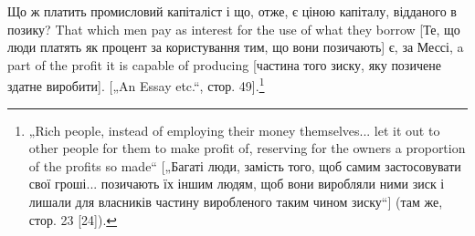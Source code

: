 Що ж платить промисловий капіталіст і що, отже, є ціною
капіталу, відданого в позику? That which men pay as interest for
the use of what they borrow [Те, що люди платять як процент за
користування тим, що вони позичають] є, за Мессі, a part of the
profit it is capable of producing [частина того зиску, яку позичене
здатне виробити]. [„An Essay etc.“, стор. 49].\footnote{
„Rich people, instead of employing their money themselves... let it out to
other people for them to make profit of, reserving for the owners a proportion of
the profits so made“ [„Багаті люди, замість того, щоб самим застосовувати свої
гроші... позичають їх іншим людям, щоб вони виробляли ними зиск і лишали для
власників частину виробленого таким чином зиску“] (там же, стор. 23 [24]).
}
